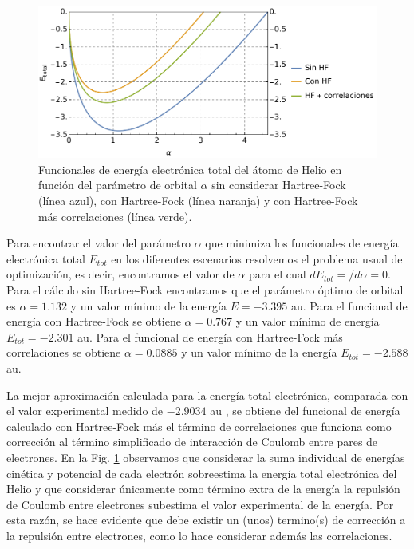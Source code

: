 \documentclass[11pt,letterpaper]{article}
\begin{document}
\begin{figure}
\hspace{3.2cm}
\includegraphics[width=14cm]{fig_tarea06}
\caption{Funcionales de energía electrónica total del átomo de Helio en función
del parámetro de orbital $\alpha$ sin considerar
Hartree-Fock (línea azul), con Hartree-Fock (línea naranja) y con
Hartree-Fock más correlaciones (línea verde).}
\label{fig}
\end{figure}

Para encontrar el valor del parámetro $\alpha$ que minimiza los 
funcionales de energía electrónica total $E_{tot}$ en los diferentes
escenarios resolvemos el problema usual de optimización, es decir, 
encontramos el valor de $\alpha$ para el cual $d E_{tot}=/d\alpha=0$. Para 
el cálculo sin Hartree-Fock encontramos que el parámetro óptimo de orbital es 
$\alpha=1.132$ y un valor mínimo de la energía $E=-3.395$ au. Para 
el funcional de energía con Hartree-Fock se obtiene $\alpha=0.767$ y 
un valor mínimo de energía $E_{tot}=-2.301$ au. Para el funcional de energía 
con Hartree-Fock más correlaciones se obtiene $\alpha=0.0885$ y un valor 
mínimo de la energía $E_{tot}=-2.588$ au.

La mejor aproximación calculada para la energía total electrónica, 
comparada con el valor experimental medido de $-2.9034$ au
\cite{baseden2014introduction},
se obtiene del funcional de energía calculado con Hartree-Fock más 
el término de correlaciones que funciona como corrección al término
simplificado de interacción de Coulomb entre pares de electrones. 
En la Fig. \ref{fig} observamos que considerar la suma individual 
de energías cinética y potencial de cada electrón sobreestima la energía
total electrónica del Helio y que considerar únicamente como término 
extra de la energía la repulsión de Coulomb entre electrones subestima 
el valor experimental de la energía. Por esta razón, se hace evidente
que debe existir un (unos) termino(s) de corrección a la repulsión 
entre electrones, como lo hace considerar además las correlaciones.
 



\end{document}
